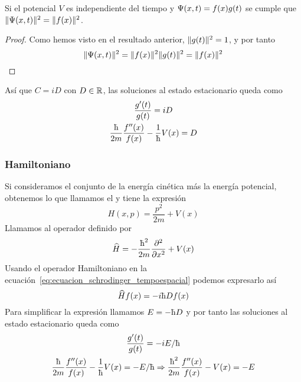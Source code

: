 \begin{proposition}
    Si el potencial $V$ es independiente del tiempo y $\Psi(x,t)=f(x)g(t)$ se cumple que $\lVert\Psi(x,t)\rVert^2=\lVert f(x)\rVert^2$.
\end{proposition}
\begin{proof}
    Como hemos visto en el resultado anterior, $\lVert g(t)\rVert^2=1$, y por tanto
    \begin{equation}
        \label{eq:probabilidad_atemporal}
        \lVert\Psi(x,t)\rVert^2=\lVert f(x)\rVert^2\lVert g(t)\rVert^2=\lVert f(x)\rVert^2
    \end{equation}
\end{proof}
Así que $C=iD$ con $D\in\mathbb{R}$, las soluciones al estado estacionario queda como
\begin{gather*}
    \frac{g'(t)}{g(t)}=iD
    \\
    \frac{\planckbarsymbol}{2m}\frac{f''(x)}{f(x)}-\frac{1}{\planckbarsymbol}V(x)=D
\end{gather*}

\subsubsection{Hamiltoniano}
Si consideramos el conjunto de la energía cinética más la energía potencial, obtenemos lo que llamamos el  y tiene la expresión
\begin{equation}
    \label{eq:halmitoniano}
    H(x,p)=\frac{p^2}{2m}+V(x)
\end{equation}
Llamamos  al operador definido por
\begin{equation}
    \label{eq:operador_hamiltoniano}
    \widehat{H}=-\frac{\planckbarsymbol^2}{2m}\frac{\partial^2}{\partial x^2}+V(x)
\end{equation}
Usando el operador Hamiltoniano en la ecuación~\eqref{eq:ecuacion_schrodinger_tempoespacial} podemos expresarlo así
\begin{equation*}
    \widehat{H}f(x)=-i\planckbarsymbol Df(x)
\end{equation*}
Para simplificar la expresión llamamos $E=-\planckbarsymbol D$ y por tanto las soluciones al estado estacionario queda como
\begin{gather*}
    \frac{g'(t)}{g(t)}=-iE/\planckbarsymbol
    \\
    \frac{\planckbarsymbol}{2m}\frac{f''(x)}{f(x)}-\frac{1}{\planckbarsymbol}V(x)=-E/\planckbarsymbol\Rightarrow \frac{\planckbarsymbol^2}{2m}\frac{f''(x)}{f(x)}-V(x)=-E
\end{gather*}


